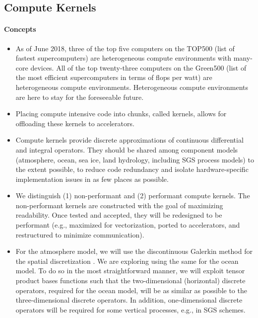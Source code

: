 \documentclass{article}
\begin{document}
\subsection{Compute Kernels}

\paragraph{Concepts}
\begin{itemize}
    \item As of June 2018, three of the top five computers on the TOP500 (list of fastest supercomputers) are heterogeneous compute environments with many-core devices.  All of the top twenty-three computers on the Green500 (list of the most efficient supercomputers in terms of flops per watt) are heterogeneous compute environments.  Heterogeneous compute environments are here to stay for the foreseeable future.
    \item Placing compute intensive code into chunks, called kernels, allows for offloading these kernels to accelerators.
    \item Compute kernels provide discrete approximations of continuous differential and integral operators. They should be shared among component models (atmosphere, ocean, sea ice, land hydrology, including SGS process models) to the extent possible, to reduce code redundancy and isolate hardware-specific implementation issues in as few places as possible. 
    \item We distinguish (1) non-performant and (2) performant compute kernels. The non-performant kernels are constructed with the goal of maximizing readability.  Once tested and accepted, they will be redesigned to be performant (e.g., maximized for vectorization, ported to accelerators, and restructured to minimize communication).
    \item For the atmosphere model, we will use the discontinuous Galerkin method for the spatial discretization \citep{abdi:2016}. We are exploring using the same for the ocean model.  To do so in the most straightforward manner, we will exploit tensor product bases functions such that the two-dimensional (horizontal) discrete operators, required for the ocean model, will be as similar as possible to the three-dimensional discrete operators. In addition, one-dimensional discrete operators will be required for some vertical processes, e.g., in SGS schemes.
\end{itemize}
\end{document}
